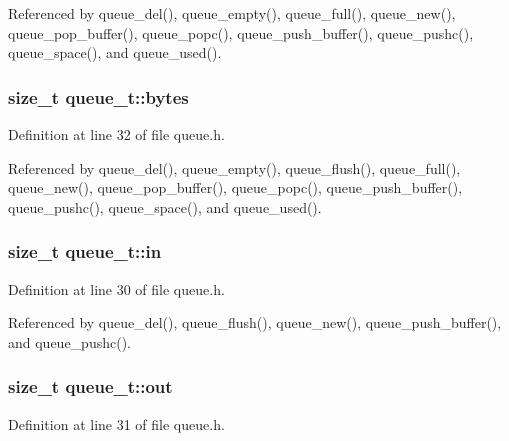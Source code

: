 Referenced by queue\+\_\+del(), queue\+\_\+empty(), queue\+\_\+full(), queue\+\_\+new(), queue\+\_\+pop\+\_\+buffer(), queue\+\_\+popc(), queue\+\_\+push\+\_\+buffer(), queue\+\_\+pushc(), queue\+\_\+space(), and queue\+\_\+used().

\subsubsection[{\texorpdfstring{bytes}{bytes}}]{\setlength{\rightskip}{0pt plus 5cm}size\+\_\+t queue\+\_\+t\+::bytes}\hypertarget{structqueue__t_a58398d4ee60bc90ffba2bc3488fe185b}{}\label{structqueue__t_a58398d4ee60bc90ffba2bc3488fe185b}


Definition at line 32 of file queue.\+h.



Referenced by queue\+\_\+del(), queue\+\_\+empty(), queue\+\_\+flush(), queue\+\_\+full(), queue\+\_\+new(), queue\+\_\+pop\+\_\+buffer(), queue\+\_\+popc(), queue\+\_\+push\+\_\+buffer(), queue\+\_\+pushc(), queue\+\_\+space(), and queue\+\_\+used().

\subsubsection[{\texorpdfstring{in}{in}}]{\setlength{\rightskip}{0pt plus 5cm}size\+\_\+t queue\+\_\+t\+::in}\hypertarget{structqueue__t_a7a6832e36c70a1db7fddc93fb6be9d63}{}\label{structqueue__t_a7a6832e36c70a1db7fddc93fb6be9d63}


Definition at line 30 of file queue.\+h.



Referenced by queue\+\_\+del(), queue\+\_\+flush(), queue\+\_\+new(), queue\+\_\+push\+\_\+buffer(), and queue\+\_\+pushc().

\subsubsection[{\texorpdfstring{out}{out}}]{\setlength{\rightskip}{0pt plus 5cm}size\+\_\+t queue\+\_\+t\+::out}\hypertarget{structqueue__t_a8f6e1c623d2ceed398a71a0aab93b0fa}{}\label{structqueue__t_a8f6e1c623d2ceed398a71a0aab93b0fa}


Definition at line 31 of file queue.\+h.



